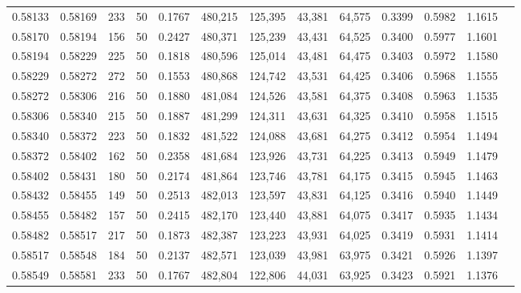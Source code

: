 \begin{tabular}{rrrrrrrrrrrrr}
0.58133 & 0.58169 &   233 &  50 &                                     0.1767 & 480,215 & 125,395 &  43,381 &  64,575 & 0.3399 & 0.5982 & 1.1615 \\
0.58170 & 0.58194 &   156 &  50 &                                     0.2427 & 480,371 & 125,239 &  43,431 &  64,525 & 0.3400 & 0.5977 & 1.1601 \\
0.58194 & 0.58229 &   225 &  50 &                                     0.1818 & 480,596 & 125,014 &  43,481 &  64,475 & 0.3403 & 0.5972 & 1.1580 \\
0.58229 & 0.58272 &   272 &  50 &                                     0.1553 & 480,868 & 124,742 &  43,531 &  64,425 & 0.3406 & 0.5968 & 1.1555 \\
0.58272 & 0.58306 &   216 &  50 &                                     0.1880 & 481,084 & 124,526 &  43,581 &  64,375 & 0.3408 & 0.5963 & 1.1535 \\
0.58306 & 0.58340 &   215 &  50 &                                     0.1887 & 481,299 & 124,311 &  43,631 &  64,325 & 0.3410 & 0.5958 & 1.1515 \\
0.58340 & 0.58372 &   223 &  50 &                                     0.1832 & 481,522 & 124,088 &  43,681 &  64,275 & 0.3412 & 0.5954 & 1.1494 \\
0.58372 & 0.58402 &   162 &  50 &                                     0.2358 & 481,684 & 123,926 &  43,731 &  64,225 & 0.3413 & 0.5949 & 1.1479 \\
0.58402 & 0.58431 &   180 &  50 &                                     0.2174 & 481,864 & 123,746 &  43,781 &  64,175 & 0.3415 & 0.5945 & 1.1463 \\
0.58432 & 0.58455 &   149 &  50 &                                     0.2513 & 482,013 & 123,597 &  43,831 &  64,125 & 0.3416 & 0.5940 & 1.1449 \\
0.58455 & 0.58482 &   157 &  50 &                                     0.2415 & 482,170 & 123,440 &  43,881 &  64,075 & 0.3417 & 0.5935 & 1.1434 \\
0.58482 & 0.58517 &   217 &  50 &                                     0.1873 & 482,387 & 123,223 &  43,931 &  64,025 & 0.3419 & 0.5931 & 1.1414 \\
0.58517 & 0.58548 &   184 &  50 &                                     0.2137 & 482,571 & 123,039 &  43,981 &  63,975 & 0.3421 & 0.5926 & 1.1397 \\
0.58549 & 0.58581 &   233 &  50 &                                     0.1767 & 482,804 & 122,806 &  44,031 &  63,925 & 0.3423 & 0.5921 & 1.1376 \\

\end{tabular}
